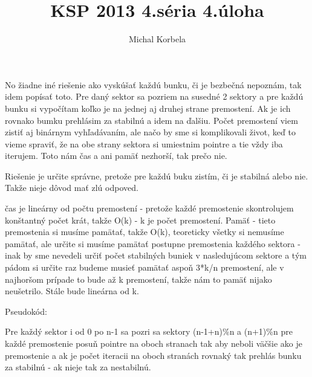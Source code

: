 \documentclass[a4paper,11pt]{article}
\title{KSP 2013 4.séria 4.úloha}
\author{Michal Korbela}
\begin{document}
No žiadne iné riešenie ako vyskúšať každú bunku, či je bezbečná nepoznám, tak idem popísať toto. Pre daný sektor sa pozriem na susedné 2 sektory a pre každú bunku  si vypočítam koľko je na jednej aj druhej strane premostení. Ak je ich rovnako bumku prehlásim za stabilnú a idem na ďalšiu.
Počet premostení viem zistiť aj binárnym vyhľadávaním, ale načo by sme si komplikovali život, keď to vieme spraviť, že na obe strany sektora si umiestnim pointre a tie vždy iba iterujem. Toto nám čas a ani pamäť nezhorší, tak prečo nie.

Riešenie je určite správne, pretože pre každú buku zistím, či je stabilná alebo nie. Takže nieje dôvod mať zlú odpoved.

čas je lineárny od počtu premostení - pretože každé premostenie skontrolujem konštantný počet krát, takže O(k) - k je počet premostení.
Pamäť - tieto premostenia si musíme pamätať, takže O(k), teoreticky všetky si nemusíme pamätať, ale určite si musíme pamätať postupne premostenia každého sektora - inak by sme nevedeli určiť počet stabilných buniek v nasledujúcom sektore a tým pádom si určite raz budeme musieť pamätať aspoň 3*k/n premostení, ale v najhoršom prípade to bude až k premostení, takže nám to pamäť nijako neušetrilo. Stále bude lineárna od k.

 
Pseudokód:








Pre každý sektor i od 0 po n-1 sa pozri sa sektory (n-1+n)\%n a (n+1)\%n
	pre každé premostenie posuň pointre na oboch stranach tak aby neboli väčšie ako je premostenie a ak je počet iteracii na oboch stranách rovnaký tak prehlás bunku za stabilnú - ak nieje tak za nestabilnú.		
\end{document}

